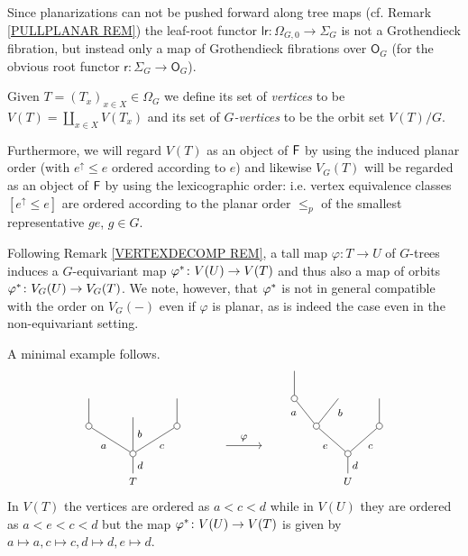 \documentclass[a4paper,10pt]{article}%
\begin{document}
\begin{remark}\label{LRROOTMAP REM}
	Since planarizations can not be pushed forward along tree maps (cf. Remark \ref{PULLPLANAR REM})
the leaf-root functor $\mathsf{lr} \colon \Omega_{G,0} \to \Sigma_G$ is not a Grothendieck fibration,
but instead only a map of Grothendieck fibrations over $\mathsf{O}_G$ 
(for the obvious root functor $\mathsf{r} \colon \Sigma_G \to \mathsf{O}_G$).
\end{remark}


\begin{definition}\label{VG DEF}
Given $T = (T_x)_{x \in X} \in \Omega_G$ we define its set of \textit{vertices} to be $V(T) = \coprod_{x \in X} V(T_x)$
and its set of
	\textit{$G$-vertices} to be the orbit set $V(T)/G$.
	
Furthermore, we will regard 
$V(T)$ as an object of $\mathsf{F}$ by using the induced planar order
(with $e^{\uparrow}\leq e$ ordered according to $e$)
and likewise $V_G(T)$ will be regarded as an object of $\mathsf{F}$ by using the lexicographic order: i.e. vertex equivalence classes 
$[e^{\uparrow} \leq e]$ are ordered according to the planar order $\leq_p$ of the smallest representative $ge$, $g \in G$.
\end{definition}


\begin{remark}\label{VERTEXDECOMPG REM}
	Following Remark \ref{VERTEXDECOMP REM},
	a tall map $\varphi \colon T \to U$ of $G$-trees
	induces a $G$-equivariant map
	$\varphi^{\**} \colon V(U) \to V(T)$
	and thus also a map of orbits
	$\varphi^{\**} \colon V_G(U) \to V_G(T)$.
	We note, however, that $\varphi^{\**}$ is not in general compatible with the order on $V_G(\minus)$ even if $\varphi$ is planar, as is indeed the case even in the non-equivariant setting.

A minimal example follows.
		\[
		\begin{tikzpicture}[grow=up,auto,level distance=2.2em,
		every node/.style = {font=\footnotesize},
		dummy/.style={circle,draw,inner sep=0pt,minimum size=1.75mm}]
		\node at (0,0) {$T$}
			child{node [dummy] {}
				child[sibling distance = 3.5em]{node [dummy] {}
					child
				edge from parent node[swap] {$c$}}
				child[level distance=2.9em]{
				edge from parent node [swap] {$b$}}
				child[sibling distance = 3.5em]{node [dummy] {}
					child
				edge from parent node {$a$}}		
			edge from parent node [swap] {$d$}};
		\node at (6,0) {$U$}
			child{node [dummy] {}
				child[sibling distance = 5em]{node [dummy] {}
					child
				edge from parent node [swap] {$c$}}
				child[sibling distance = 5em]{node [dummy] {}
					child[sibling distance = 3.5em]{
					edge from parent node [swap,near end] {$b$}}
					child[sibling distance = 3.5em]{node [dummy] {}
						child
					edge from parent node [near end]{$a$}}
				edge from parent node {$e$}}
			edge from parent node [swap] {$d$}};
		\draw[->] (2.6,1) -- node [above] {$\varphi$} (3.6,1) ;
		\end{tikzpicture}
		\]
In $V(T)$ the vertices are ordered as $a<c<d$ while in $V(U)$ they are ordered as $a<e<c<d$ but the map 
$\varphi^{\**} \colon V(U) \to V(T)$ is given by 
$a \mapsto a, c \mapsto c, d \mapsto d, e \mapsto d$.
\end{remark}
\end{document}
